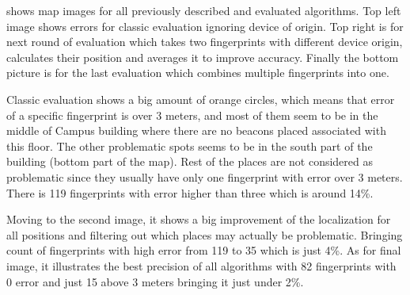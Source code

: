  shows map images for all previously described and evaluated algorithms. Top left image shows errors for classic evaluation ignoring device of origin. Top right is for next round of evaluation which takes two fingerprints with different device origin, calculates their position and averages it to improve accuracy. Finally the bottom picture is for the last evaluation which combines multiple fingerprints into one. 

Classic evaluation shows a big amount of orange circles, which means that error of a specific fingerprint is over 3 meters, and most of them seem to be in the middle of Campus building where there are no beacons placed associated with this floor. The other problematic spots seems to be in the south part of the building (bottom part of the map). Rest of the places are not considered as problematic since they usually have only one fingerprint with error over 3 meters. There is 119 fingerprints with error higher than three which is around 14\%.

Moving to the second image, it shows a big improvement of the localization for all positions and filtering out which places may actually be problematic. Bringing count of fingerprints with high error from 119 to 35 which is just 4\%. As for final image, it illustrates the best precision of all algorithms with 82 fingerprints with 0 error and just 15 above 3 meters bringing it just under 2\%.   
